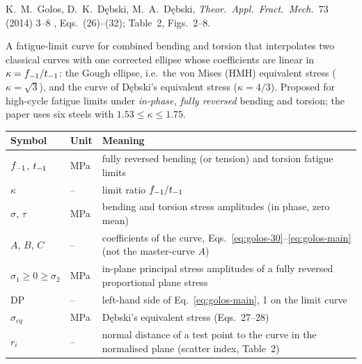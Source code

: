 \label{sheet:GOLOS}

 K.~M.~Golos, D.~K.~D\k{e}bski, M.~A.~D\k{e}bski, \emph{Theor.\ Appl.\ Fract.\ Mech.}\ 73
(2014) 3--8 \cite{golos2014}, Eqs.~(26)--(32); Table~2, Figs.~2--8.

 A fatigue-limit curve for combined bending and torsion that interpolates two
classical curves with one corrected ellipse whose coefficients are linear in $\kappa=f_{-1}/t_{-1}$: the
Gough ellipse, i.e.\ the von Mises (HMH) equivalent stress ($\kappa=\sqrt3$), and the curve of
D\k{e}bski's equivalent stress ($\kappa=4/3$). Proposed for high-cycle fatigue limits under
\emph{in-phase, fully reversed} bending and torsion; the paper uses six steels with
$1.53\le\kappa\le1.75$.

\begin{center}\small
\begin{tabular}{@{}llp{100mm}@{}}
\toprule
Symbol & Unit & Meaning\\\midrule
$f_{-1}$, $t_{-1}$ & MPa & fully reversed bending (or tension) and torsion fatigue limits\\
$\kappa$ & -- & limit ratio $f_{-1}/t_{-1}$\\
$\sigma$, $\tau$ & MPa & bending and torsion stress amplitudes (in phase, zero mean)\\
$A$, $B$, $C$ & -- & coefficients of the curve, Eqs.~\eqref{eq:golos-30}--\eqref{eq:golos-main} (not the master-curve $A$)\\
$\sigma_1\ge0\ge\sigma_2$ & MPa & in-plane principal stress amplitudes of a fully reversed proportional plane stress\\
$\mathrm{DP}$ & -- & left-hand side of Eq.~\eqref{eq:golos-main}, 1 on the limit curve\\
$\sigma_{eq}$ & MPa & D\k{e}bski's equivalent stress (Eqs.~27--28)\\
$r_i$ & -- & normal distance of a test point to the curve in the normalised plane (scatter index, Table~2)\\
\bottomrule
\end{tabular}
\end{center}

